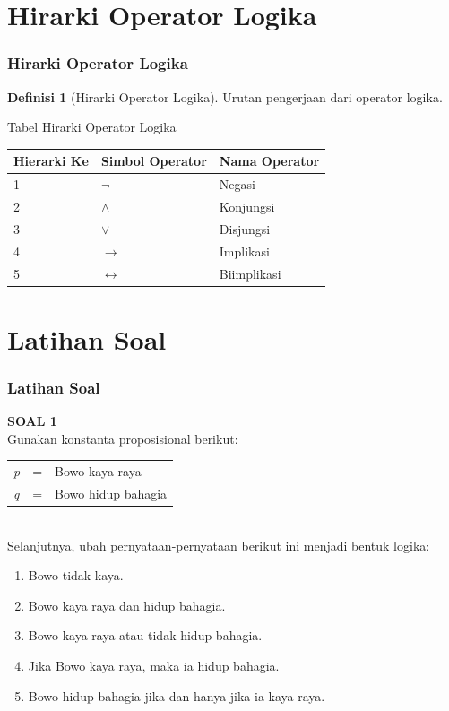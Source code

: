 \documentclass[handout]{beamer}
\theoremstyle{definition}
\newtheorem{definisi}[theorem]{Definisi}
\theoremstyle{example}
\begin{document}
\section{Hirarki Operator Logika}
\begin{frame}
	\frametitle{Hirarki Operator Logika}
  \begin{definisi}[Hirarki Operator Logika]
  	Urutan pengerjaan dari operator logika.
  \end{definisi}
  \begin{block}{Tabel Hirarki Operator Logika }
  \begin{tabular}{ | l | l | l |}
  	\hline
  	Hierarki Ke & Simbol Operator & Nama Operator \\ \hline
  	1 & $\neg$ & Negasi \\ \hline
  	2 & $\wedge$ & Konjungsi \\ \hline
  	3 & $\vee$ & Disjungsi \\ \hline
  	4 & $\rightarrow$ & Implikasi \\ \hline
  	5 & $\leftrightarrow$ & Biimplikasi \\     		 
  	\hline
  \end{tabular}
  \end{block}
\end{frame}

\section{Latihan Soal}
\begin{frame}
	\frametitle{Latihan Soal}
	\textbf{SOAL 1}\\	
	Gunakan konstanta proposisional berikut:\\	 
	\begin{tabular}{l c l}
      \textit{p} & = & Bowo kaya raya\\
      \textit{q} & = & Bowo hidup bahagia
    \end{tabular}\\	
	Selanjutnya, ubah pernyataan-pernyataan berikut ini menjadi bentuk logika:\\	
	\begin{enumerate}
		\item Bowo tidak kaya.
		\item Bowo kaya raya dan hidup bahagia.
		\item Bowo kaya raya atau tidak hidup bahagia.
		\item Jika Bowo kaya raya, maka ia hidup bahagia.
		\item Bowo hidup bahagia jika dan hanya jika ia kaya raya.
	\end{enumerate}		
\end{frame}
\end{document}
